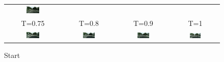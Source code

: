 \begin{figure}
\begin{tabular}{cccc}
        \includegraphics[width=0.25\textwidth]{Chapters/figures/experiments/seg_start/0_0.7_cond_sample.png}  \\
        T=0.75 & T=0.8 & T=0.9 & T=1  \\
        \includegraphics[width=0.25\textwidth]{Chapters/figures/experiments/seg_start/0_0.75_cond_sample.png} & 
        \includegraphics[width=0.25\textwidth]{Chapters/figures/experiments/seg_start/0_0.8_cond_sample.png} & 
        \includegraphics[width=0.25\textwidth]{Chapters/figures/experiments/seg_start/0_0.9_cond_sample.png} & 
        \includegraphics[width=0.25\textwidth]{Chapters/figures/experiments/seg_start/0_1.0_cond_sample.png}
    \end{tabular}
    \caption{Start}
    \label{tab:my_label}
\end{figure}